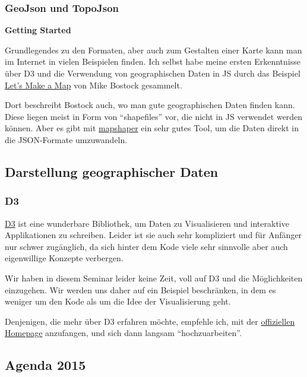 \subsubsection{\texorpdfstring{{GeoJson und
TopoJson}}{GeoJson und TopoJson}}

\textbf{Getting Started}

Grundlegendes zu den Formaten, aber auch zum Gestalten einer Karte kann
man im Internet in vielen Beispielen finden. Ich selbst habe meine
ersten Erkenntnisse über D3 und die Verwendung von geographischen Daten
in JS durch das Beispiel \href{http://bost.ocks.org/mike/map/}{Let's
Make a Map} von Mike Bostock gesammelt.

Dort beschreibt Bostock auch, wo man gute geographischen Daten finden
kann. Diese liegen meist in Form von ``shapefiles'' vor, die nicht in JS
verwendet werden können. Aber es gibt mit
\href{http://mapshaper.org/}{mapshaper} ein sehr gutes Tool, um die
Daten direkt in die JSON-Formate umzuwandeln.

\subsection{\texorpdfstring{{Darstellung geographischer
Daten}}{Darstellung geographischer Daten}}

\subsubsection{\texorpdfstring{{D3}}{D3}}

\href{http://d3js.org}{D3} ist eine wunderbare Bibliothek, um Daten zu
Visualisieren und interaktive Applikationen zu schreiben. Leider ist sie
auch sehr kompliziert und für Anfänger nur schwer zugänglich, da sich
hinter dem Kode viele sehr sinnvolle aber auch eigenwillige Konzepte
verbergen.

Wir haben in diesem Seminar leider keine Zeit, voll auf D3 und die
Möglichkeiten einzugehen. Wir werden uns daher auf ein Beispiel
beschränken, in dem es weniger um den Kode als um die Idee der
Visualisierung geht.

Denjenigen, die mehr über D3 erfahren möchte, empfehle ich, mit der
\href{http://d3js.org}{offiziellen Homepage} anzufangen, und sich dann
langsam ``hochzuarbeiten''.

\subsection{\texorpdfstring{{Agenda 2015}}{Agenda 2015}}

